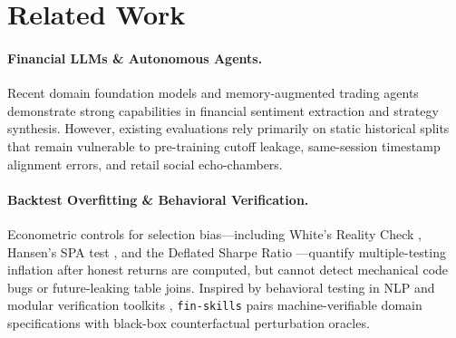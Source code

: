 \section{Related Work}
\label{sec:related}

\paragraph{Financial LLMs \& Autonomous Agents.}
Recent domain foundation models \citep{wu2023bloomberggpt,yang2023fingpt} and memory-augmented trading agents \citep{yu2024finmem} demonstrate strong capabilities in financial sentiment extraction and strategy synthesis. However, existing evaluations rely primarily on static historical splits that remain vulnerable to pre-training cutoff leakage, same-session timestamp alignment errors, and retail social echo-chambers.

\paragraph{Backtest Overfitting \& Behavioral Verification.}
Econometric controls for selection bias—including White's Reality Check \citep{white2000reality}, Hansen's SPA test \citep{hansen2005spa}, and the Deflated Sharpe Ratio \citep{bailey2014deflated,bailey2017pbo}—quantify multiple-testing inflation after honest returns are computed, but cannot detect mechanical code bugs or future-leaking table joins. Inspired by behavioral testing in NLP \citep{ribeiro2020checklist} and modular verification toolkits \citep{zhao2019pyod}, \texttt{fin-skills} pairs machine-verifiable domain specifications with black-box counterfactual perturbation oracles.
